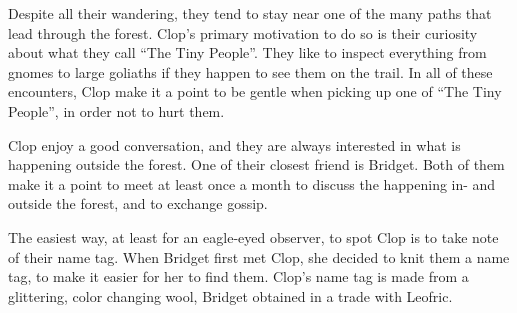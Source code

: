 \begin{multicols}{2}
Despite all their wandering, they tend to stay near one of the many paths that lead through the forest.
Clop's primary motivation to do so is their curiosity about what they call ``The Tiny People''.
They like to inspect everything from gnomes to large goliaths if they happen to see them on the trail.
In all of these encounters, Clop make it a point to be gentle when picking up one of ``The Tiny People'', in order not to hurt them.

Clop enjoy a good conversation, and they are always interested in what is happening outside the forest.
One of their closest friend is Bridget.
Both of them make it a point to meet at least once a month to discuss the happening in- and outside the forest, and to exchange gossip.

The easiest way, at least for an eagle-eyed observer, to spot Clop is to take note of their name tag.
When Bridget first met Clop, she decided to knit them a name tag, to make it easier for her to find them.
Clop's name tag is made from a glittering, color changing wool, Bridget obtained in a trade with Leofric.

\end{multicols}
